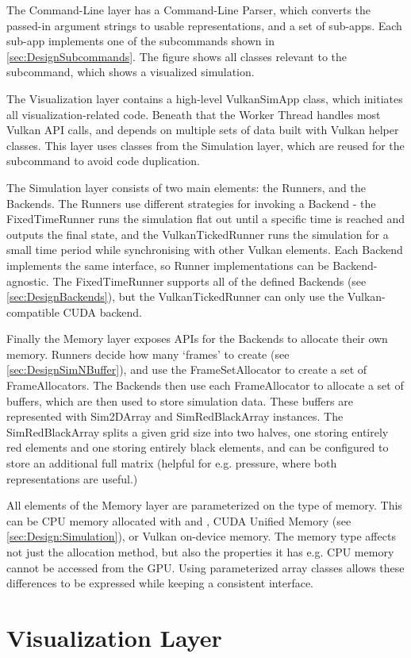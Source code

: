 The Command-Line layer has a Command-Line Parser, which converts the passed-in argument strings to usable representations, and a set of sub-apps.
Each sub-app implements one of the subcommands shown in \cref{sec:DesignSubcommands}.
The figure shows all classes relevant to the  subcommand, which shows a visualized simulation.

The Visualization layer contains a high-level VulkanSimApp class, which initiates all visualization-related code.
Beneath that the Worker Thread handles most Vulkan API calls, and depends on multiple sets of data built with Vulkan helper classes.
This layer uses classes from the Simulation layer, which are reused for the  subcommand to avoid code duplication.

The Simulation layer consists of two main elements: the Runners, and the Backends.
The Runners use different strategies for invoking a Backend - the FixedTimeRunner runs the simulation flat out until a specific time is reached and outputs the final state, and the VulkanTickedRunner runs the simulation for a small time period while synchronising with other Vulkan elements.
Each Backend implements the same interface, so Runner implementations can be Backend-agnostic.
The FixedTimeRunner supports all of the defined Backends (see \cref{sec:DesignBackends}), but the VulkanTickedRunner can only use the Vulkan-compatible CUDA backend.

Finally the Memory layer exposes APIs for the Backends to allocate their own memory.
Runners decide how many `frames' to create (see \cref{sec:DesignSimNBuffer}), and use the FrameSetAllocator to create a set of FrameAllocators.
The Backends then use each FrameAllocator to allocate a set of buffers, which are then used to store simulation data.
These buffers are represented with Sim2DArray and SimRedBlackArray instances.
The SimRedBlackArray splits a given grid size into two halves, one storing entirely red elements and one storing entirely black elements, and can be configured to store an additional full matrix (helpful for e.g. pressure, where both representations are useful.)

All elements of the Memory layer are parameterized on the type of memory.
This can be CPU memory allocated with  and , CUDA Unified Memory (see \cref{sec:Design:Simulation}), or Vulkan on-device memory. 
The memory type affects not just the allocation method, but also the properties it has e.g. CPU memory cannot be accessed from the GPU.
Using parameterized array classes allows these differences to be expressed while keeping a consistent interface.



\pagebreak
\section{Visualization Layer}



